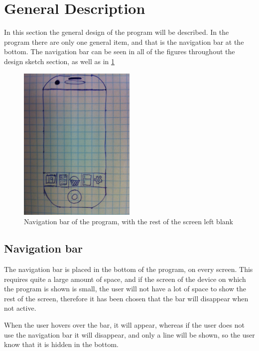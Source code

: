 \section{General Description}\label{Sketches}

In this section the general design of the program will be described. In the program there are only one general item, and that is the navigation bar at the bottom. The navigation bar can be seen in all of the figures throughout the design sketch section, as well as in \cref{NavigationBarSketch}

\begin{figure}[H]
	\centering
    \includegraphics[width=0.5\textwidth]{Grafik/FoodPlanner/NavigationBarSketch}
	\caption{Navigation bar of the program, with the rest of the screen left blank}
	\label{NavigationBarSketch}
\end{figure}

\subsection{Navigation bar}

The navigation bar is placed in the bottom of the program, on every screen. This requires quite a large amount of space, and if the screen of the device on which the program is shown is small, the user will not have a lot of space to show the rest of the screen, therefore it has been chosen that the bar will disappear when not active.

When the user hovers over the bar, it will appear, whereas if the user does not use the navigation bar it will disappear, and only a line will be shown, so the user know that it is hidden in the bottom.


